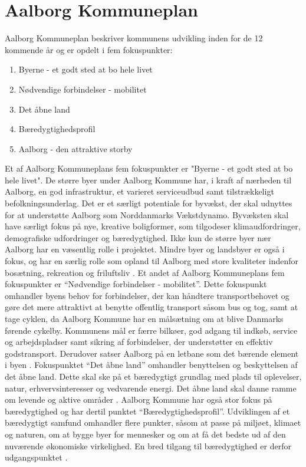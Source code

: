 \section{Aalborg Kommuneplan}
Aalborg Kommuneplan beskriver kommunens udvikling inden for de 12 kommende år og er opdelt i fem fokuspunkter: 
\begin{enumerate}
	\item Byerne - et godt sted at bo hele livet
	\item Nødvendige forbindelser - mobilitet
	\item Det åbne land
	\item Bæredygtighedsprofil
	\item Aalborg - den attraktive storby
\end{enumerate}
Et af Aalborg Kommuneplans fem fokuspunkter er "Byerne - et godt sted at bo hele livet". De større byer under Aalborg Kommune har, i kraft af nærheden til Aalborg, en god infrastruktur,  et varieret serviceudbud samt tilstrækkeligt befolkningsunderlag. Det er et særligt potentiale for byvækst, der skal udnyttes for at understøtte Aalborg som Norddanmarks Vækstdynamo. 
\newline \indent{     }  Byvæksten skal have særligt fokus på nye, kreative boligformer, som tilgodeser klimaudfordringer, demografiske udfordringer og bæredygtighed. 
\newline \indent{     }  Ikke kun de større byer nær Aalborg har en væsentlig rolle i projektet. Mindre byer og landsbyer er også i fokus, og har en særlig rolle som opland til Aalborg med store kvaliteter indenfor bosætning, rekreation og friluftsliv \citep{byerne}.
\newline
\newline
Et andet af Aalborg Kommuneplans fem fokuspunkter er “Nødvendige forbindelser - mobilitet”. Dette fokuspunkt omhandler byens behov for forbindelser, der kan håndtere transportbehovet og gøre det mere attraktivt at benytte offentlig transport såsom bus og tog, samt at tage cyklen, da  Aalborg Kommune har en målsætning om at blive Danmarks førende cykelby. Kommunens mål er færre bilkøer, god adgang til indkøb, service og arbejdspladser samt sikring af forbindelser, der understøtter en effektiv godstransport. Derudover satser Aalborg på en letbane som det bærende element i byen \citep{mobilitet}.
\newline
\newline
Fokuspunktet “Det åbne land” omhandler benyttelsen og beskyttelsen af det åbne land. Dette skal ske på et bæredygtigt grundlag med plads til oplevelser, natur, erhvervsinteresser og vedvarende energi. Det åbne land skal danne ramme om levende og aktive områder \citep{land}.
\newline
\newline
Aalborg Kommune har også stor fokus på bæredygtighed og har dertil punktet “Bæredygtighedsprofil”. Udviklingen af et bæredygtigt samfund omhandler flere punkter, såsom at passe på miljøet, klimaet og naturen, om at bygge byer for mennesker og om at få det bedste ud af den nuværende økonomiske virkelighed. En bred tilgang til bæredygtighed er derfor udgangspunktet \citep{profil}.

